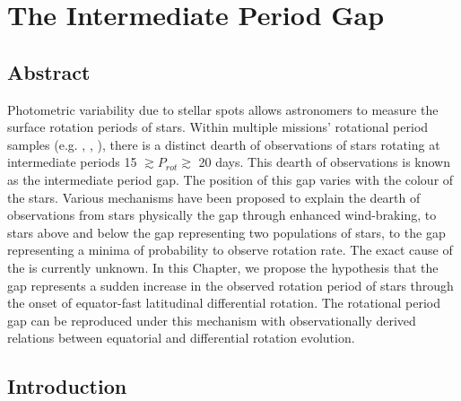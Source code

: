 
\chapter{The Intermediate Period Gap}
\label{chap:period_gap}

\section*{Abstract}


Photometric variability due to stellar spots allows astronomers to measure the surface rotation periods of stars.
Within multiple missions' rotational period samples (e.g. \kepler, \ktoo, \ZTF), there is a distinct dearth of observations of stars rotating at intermediate periods 15 $\gtrsim P_{rot} \gtrsim$ 20 days.
This dearth of observations is known as the intermediate period gap.
The position of this gap varies with the colour of the stars.
Various mechanisms have been proposed to explain the dearth of observations from stars physically  the gap through enhanced wind-braking, to stars above and below the gap representing two populations of stars, to the gap representing a minima of probability to observe rotation rate.
The exact cause of the  is currently unknown.
In this Chapter, we propose the hypothesis that the gap represents a sudden increase in the observed rotation period of stars through the onset of equator-fast latitudinal differential rotation.
The rotational period gap can be reproduced under this mechanism with observationally derived relations between equatorial and differential rotation evolution.

\newpage

\section{Introduction}
\label{sec:intro}

